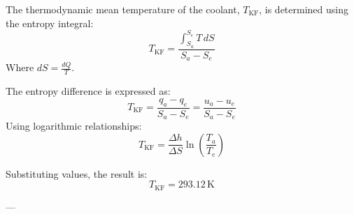 The thermodynamic mean temperature of the coolant, \( T_{\text{KF}} \), is determined using the entropy integral:  
\[
T_{\text{KF}} = \frac{\int_{S_a}^{S_e} T \, dS}{S_a - S_e}
\]  
Where \( dS = \frac{dQ}{T} \).  

The entropy difference is expressed as:  
\[
T_{\text{KF}} = \frac{q_a - q_e}{S_a - S_e} = \frac{u_a - u_e}{S_a - S_e}
\]  
Using logarithmic relationships:  
\[
T_{\text{KF}} = \frac{\Delta h}{\Delta S} \ln \left( \frac{T_a}{T_e} \right)
\]  

Substituting values, the result is:  
\[
T_{\text{KF}} = 293.12 \, \text{K}
\]  

---